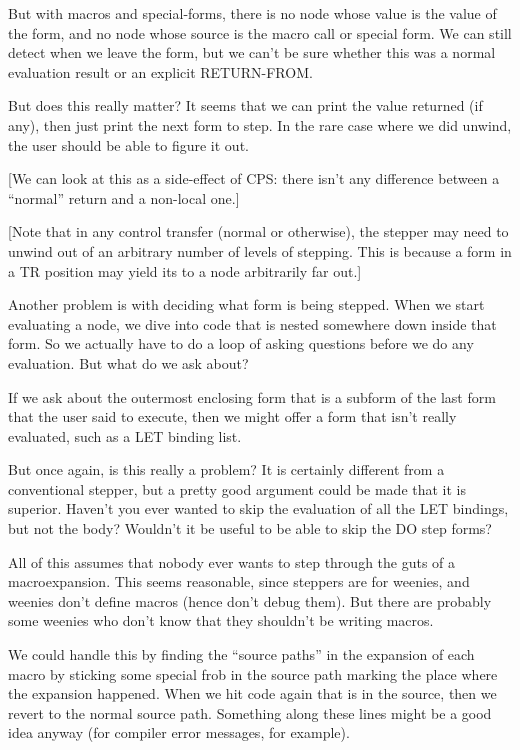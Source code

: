 But with macros and special-forms, there is no node whose value is the value of
the form, and no node whose source is the macro call or special form.  We can
still detect when we leave the form, but we can't be sure whether this was a
normal evaluation result or an explicit RETURN-FROM.  

But does this really matter?  It seems that we can print the value returned (if
any), then just print the next form to step.  In the rare case where we did
unwind, the user should be able to figure it out.  

[We can look at this as a side-effect of CPS: there isn't any difference
between a ``normal'' return and a non-local one.]

[Note that in any control transfer (normal or otherwise), the stepper may need
to unwind out of an arbitrary number of levels of stepping.  This is because a
form in a TR position may yield its to a node arbitrarily far out.]

Another problem is with deciding what form is being stepped.  When we start
evaluating a node, we dive into code that is nested somewhere down inside that
form.  So we actually have to do a loop of asking questions before we do any
evaluation.  But what do we ask about?

If we ask about the outermost enclosing form that is a subform of the last
form that the user said to execute, then we might offer a form that isn't
really evaluated, such as a LET binding list.  

But once again, is this really a problem?  It is certainly different from a
conventional stepper, but a pretty good argument could be made that it is
superior.  Haven't you ever wanted to skip the evaluation of all the
LET bindings, but not the body?  Wouldn't it be useful to be able to skip the
DO step forms?

All of this assumes that nobody ever wants to step through the guts of a
macroexpansion.  This seems reasonable, since steppers are for weenies, and
weenies don't define macros (hence don't debug them).  But there are probably
some weenies who don't know that they shouldn't be writing macros.

We could handle this by finding the ``source paths'' in the expansion of each
macro by sticking some special frob in the source path marking the place where
the expansion happened.  When we hit code again that is in the source, then we
revert to the normal source path.  Something along these lines might be a good
idea anyway (for compiler error messages, for example).  

